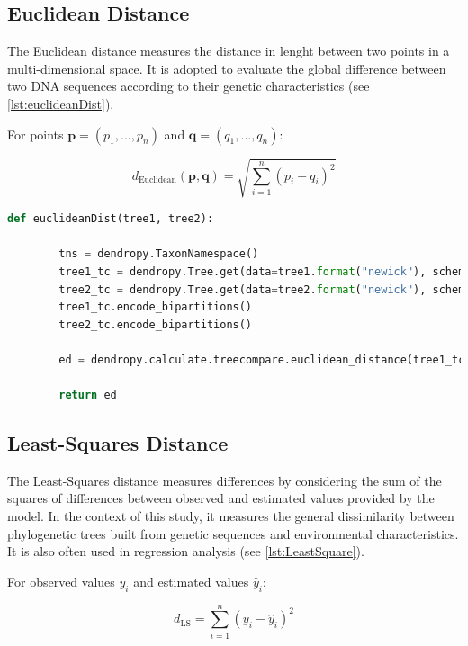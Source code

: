 \subsection{Euclidean Distance}\label{euclidean}
The Euclidean distance measures the distance in lenght between two points in a multi-dimensional space. It is adopted to evaluate the global difference between two DNA sequences according to their genetic characteristics (see \autoref{lst:euclideanDist}).

For points $\mathbf{p} = (p_1, \ldots, p_n)$ and $\mathbf{q} = (q_1, \ldots, q_n)$:

\begin{equation}
    d_{\text{Euclidean}}(\mathbf{p}, \mathbf{q}) = \sqrt{\sum_{i=1}^{n} (p_i - q_i)^2}
\end{equation}

\begin{lstlisting}[label=lst:euclideanDist,language=Python,caption=Python script for calculating the Euclidean distance using the ete3 package in the aPhyloGeo package]
    def euclideanDist(tree1, tree2):
        
        tns = dendropy.TaxonNamespace()
        tree1_tc = dendropy.Tree.get(data=tree1.format("newick"), schema="newick", taxon_namespace=tns)
        tree2_tc = dendropy.Tree.get(data=tree2.format("newick"), schema="newick", taxon_namespace=tns)
        tree1_tc.encode_bipartitions()
        tree2_tc.encode_bipartitions()

        ed = dendropy.calculate.treecompare.euclidean_distance(tree1_tc, tree2_tc)

        return ed
\end{lstlisting}

\subsection{Least-Squares Distance}\label{LS}
The Least-Squares distance measures differences by considering the sum of the squares of differences between observed and estimated values provided by the model. In the context of this study, it measures the general dissimilarity between phylogenetic trees built from genetic sequences and environmental characteristics. It is also often used in regression analysis (see \autoref{lst:LeastSquare}).

For observed values $y_i$ and estimated values $\hat{y}_i$:

\begin{equation}
    d_{\text{LS}} = \sum_{i=1}^{n} (y_i - \hat{y}_i)^2
\end{equation}

